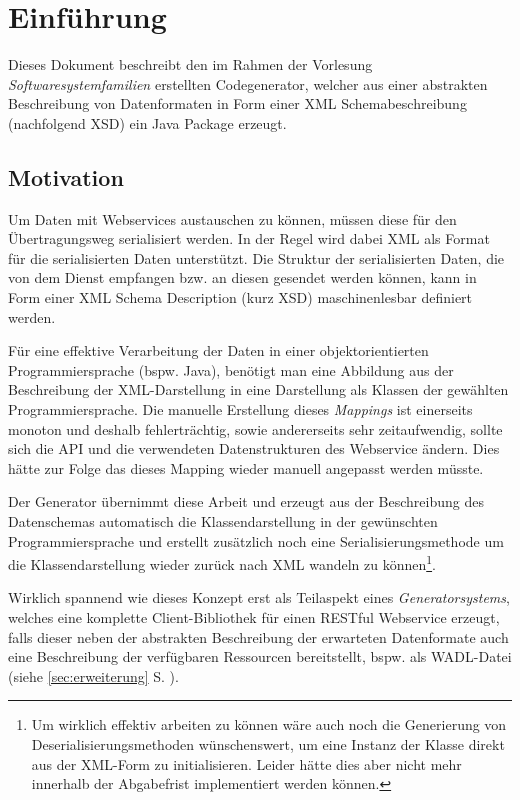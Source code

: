 \section{Einführung}

Dieses Dokument beschreibt den im Rahmen der Vorlesung \emph{Softwaresystemfamilien} erstellten Codegenerator, welcher aus einer abstrakten Beschreibung von Datenformaten in Form einer \gls{XML} Schemabeschreibung (nachfolgend \gls{XSD}) ein Java Package erzeugt.

\subsection{Motivation}

Um Daten mit Webservices austauschen zu können, müssen diese für den Übertragungsweg serialisiert werden. In der Regel wird dabei \gls{XML} als Format für die serialisierten Daten unterstützt. Die Struktur der serialisierten Daten, die von dem Dienst empfangen bzw. an diesen gesendet werden können, kann in Form einer XML Schema Description (kurz \gls{XSD}) maschinenlesbar definiert werden.

Für eine effektive Verarbeitung der Daten in einer objektorientierten Programmiersprache (bspw. Java), benötigt man eine Abbildung aus der Beschreibung der XML-Darstellung in eine Darstellung als Klassen der gewählten Programmiersprache. Die manuelle Erstellung dieses \emph{Mappings} ist einerseits monoton und deshalb fehlerträchtig, sowie andererseits sehr zeitaufwendig, sollte sich die API und die verwendeten Datenstrukturen des Webservice ändern. Dies hätte zur Folge das dieses Mapping wieder manuell angepasst werden müsste.

Der Generator übernimmt diese Arbeit und erzeugt aus der Beschreibung des Datenschemas automatisch die Klassendarstellung in der gewünschten Programmiersprache und erstellt zusätzlich noch eine Serialisierungsmethode um die Klassendarstellung wieder zurück nach \gls{XML} wandeln zu können\footnote{Um wirklich effektiv arbeiten zu können wäre auch noch die Generierung von Deserialisierungsmethoden wünschenswert, um eine Instanz der Klasse direkt aus der \gls{XML}-Form zu initialisieren. Leider hätte dies aber nicht mehr innerhalb der Abgabefrist implementiert werden können.}.

Wirklich spannend wie dieses Konzept erst als Teilaspekt eines \emph{Generatorsystems}, welches eine komplette Client-Bibliothek für einen \gls{RESTful} Webservice erzeugt, falls dieser neben der abstrakten Beschreibung der erwarteten Datenformate auch eine Beschreibung der verfügbaren Ressourcen bereitstellt, bspw. als \gls{WADL}-Datei (siehe \cref{sec:erweiterung} S. \pageref{sec:erweiterung}).

